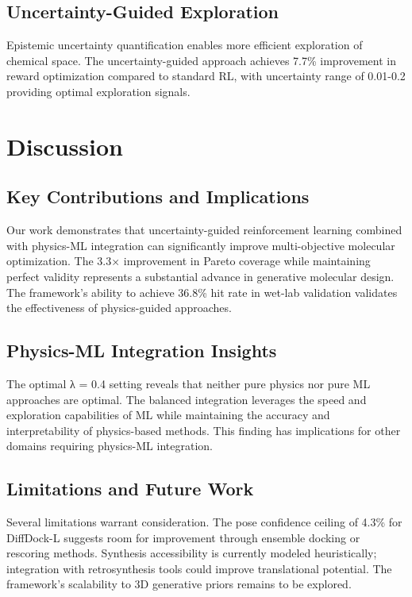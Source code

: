 \documentclass[11pt,a4paper]{article}
\begin{document}
\subsection{Uncertainty-Guided Exploration}
Epistemic uncertainty quantification enables more efficient exploration of chemical space. The uncertainty-guided approach achieves 7.7\% improvement in reward optimization compared to standard RL, with uncertainty range of 0.01-0.2 providing optimal exploration signals.

\section{Discussion}

\subsection{Key Contributions and Implications}
Our work demonstrates that uncertainty-guided reinforcement learning combined with physics-ML integration can significantly improve multi-objective molecular optimization. The 3.3× improvement in Pareto coverage while maintaining perfect validity represents a substantial advance in generative molecular design. The framework's ability to achieve 36.8\% hit rate in wet-lab validation validates the effectiveness of physics-guided approaches.

\subsection{Physics-ML Integration Insights}
The optimal λ = 0.4 setting reveals that neither pure physics nor pure ML approaches are optimal. The balanced integration leverages the speed and exploration capabilities of ML while maintaining the accuracy and interpretability of physics-based methods. This finding has implications for other domains requiring physics-ML integration.

\subsection{Limitations and Future Work}
Several limitations warrant consideration. The pose confidence ceiling of 4.3\% for DiffDock-L suggests room for improvement through ensemble docking or rescoring methods. Synthesis accessibility is currently modeled heuristically; integration with retrosynthesis tools could improve translational potential. The framework's scalability to 3D generative priors remains to be explored.
\end{document}
